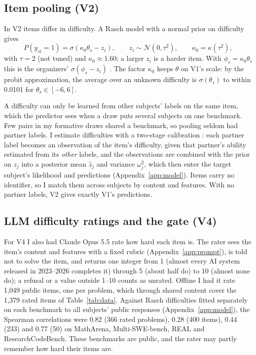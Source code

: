 \subsection{Item pooling (V2)}
In V2 items differ in difficulty. A Rasch model \citep{rasch1960} with a normal prior on difficulty gives
\begin{equation}
  P(y_{si} = 1) = \sigma(\kappa_0\theta_s - z_i), \qquad z_i \sim \mathcal{N}(0, \tau^2), \qquad \kappa_0 = \kappa(\tau^2),
  \label{eq:rasch}
\end{equation}
with $\tau = 2$ (not tuned) and $\kappa_0 \approx 1.60$; a larger $z_i$ is a harder item. With $\phi_s = \kappa_0\theta_s$ this is the organizers' $\sigma(\phi_s - z_i)$ \citep{truong2025reeval}. The factor $\kappa_0$ keeps $\theta$ on V1's scale: by the probit approximation, the average over an unknown difficulty is $\sigma(\theta_s)$ to within 0.0101 for $\theta_s \in [-6, 6]$.

A difficulty can only be learned from other subjects' labels on the same item, which the predictor sees when a draw puts several subjects on one benchmark. Few pairs in my formative draws shared a benchmark, so pooling seldom had partner labels. I estimate difficulties with a two-stage calibration \citep{ban2001online,truongkoyejo2026aims}: each partner label becomes an observation of the item's difficulty, given that partner's ability estimated from its \emph{other} labels, and the observations are combined with the prior on $z_j$ into a posterior mean $\hat z_j$ and variance $\omega_j^2$, which then enter the target subject's likelihood and predictions (Appendix~\ref{app:model}). Items carry no identifier, so I match them across subjects by content and features. With no partner labels, V2 gives exactly V1's predictions.

\subsection{LLM difficulty ratings and the gate (V4)}
For V4 I also had Claude Opus 5.5 \citep{anthropic2026opus55} rate how hard each item is. The rater sees the item's content and features with a fixed rubric (Appendix~\ref{app:prompt}), is told not to solve the item, and returns one integer from 1 (almost every AI system released in 2023--2026 completes it) through 5 (about half do) to 10 (almost none do); a refusal or a value outside 1--10 counts as unrated. Offline I had it rate 1,049 public items, one per problem, which through shared content cover the 1,379 rated items of Table~\ref{tab:data}. Against Rasch difficulties fitted separately on each benchmark to all subjects' public responses (Appendix~\ref{app:model}), the Spearman correlations were 0.82 (366 rated problems), 0.28 (400 items), 0.44 (233) and 0.77 (50) on MathArena, Multi-SWE-bench, REAL and ResearchCodeBench. These benchmarks are public, and the rater may partly remember how hard their items are.

